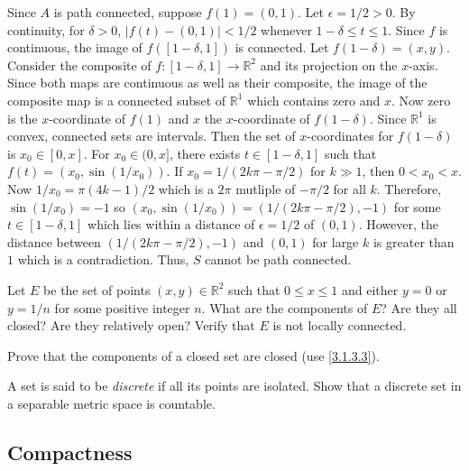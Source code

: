 \begin{exercise}[ref = \arabic{exercisei}]
  Since \(A\) is path connected, suppose \(f(1) = (0,1)\).
  Let \(\epsilon = 1/2 > 0\).
  By continuity, for \(\delta > 0\), \(\lvert f(t) - (0,1)\rvert < 1/2\)
  whenever \(1 - \delta\leq t\leq 1\).
  Since \(f\) is continuous, the image of \(f([1 - \delta,1])\) is connected.
  Let \(f(1- \delta) = (x,y)\).
  Consider the composite of \(f\colon [1 - \delta,1]\to\mathbb{R}^2\) and its
  projection on the \(x\)-axis.
  Since both maps are continuous as well as their composite, the image of the
  composite map is a connected subset of \(\mathbb{R}^1\) which contains zero
  and \(x\).
  Now zero is the \(x\)-coordinate of \(f(1)\) and \(x\) the \(x\)-coordinate
  of \(f(1 - \delta)\).
  Since \(\mathbb{R}^1\) is convex, connected sets are intervals.
  Then the set of \(x\)-coordinates for \(f(1 - \delta)\) is \(x_0\in[0,x]\).
  For \(x_0\in(0,x]\), there exists \(t\in[1 - \delta,1]\) such that
  \(f(t) = (x_0,\sin(1/x_0))\).
  If \(x_0 = 1/(2k\pi - \pi/2)\) for \(k\gg 1\), then \(0 < x_0 < x\).
  Now \(1/x_0 = \pi(4k - 1)/2\) which is a \(2\pi\) mutliple of \(-\pi/2\) for
  all \(k\).
  Therefore, \(\sin(1/x_0) = -1\) so
  \((x_0, \sin(1/x_0)) = (1/(2k\pi - \pi/2),-1)\) for some
  \(t\in[1 - \delta,1]\) which lies within a distance of \(\epsilon = 1/2\) of
  \((0,1)\).
  However, the distance between \((1/(2k\pi - \pi/2),-1)\) and \((0,1)\) for
  large \(k\) is greater than \(1\) which is a contradiction.
  Thus, \(S\) cannot be path connected.
\item
  Let \(E\) be the set of points \((x,y)\in\mathbb{R}^2\) such that
  \(0\leq x\leq 1\) and either \(y = 0\) or \(y = 1/n\) for some positive
  integer \(n\).
  What are the components of \(E\)?
  Are they all closed?
  Are they relatively open?
  Verify that \(E\) is not locally connected.
\item
  Prove that the components of a closed set are closed (use \cref{3.1.3.3}).
\item
  A set is said to be \textit{discrete} if all its points are isolated.
  Show that a discrete set in a separable metric space is countable.
\end{exercise}

\subsection{Compactness}

